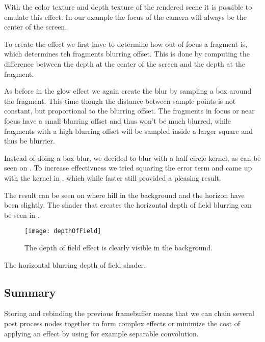 With the color texture and depth texture of the rendered scene it is
possible to emulate this effect. In our example the focus of the
camera will always be the center of the screen.

To create the effect we first have to determine how out of focus a
fragment is, which determines teh fragments blurring offset. This is
done by computing the difference between the depth at the center of
the screen and the depth at the fragment.

As before in the glow effect we again create the blur by sampling a
box around the fragment. This time though the distance between sample
points is not constant, but proportional to the blurring offset. The
fragments in focus or near focus have a small blurring offset and thus
won't be much blurred, while fragments with a high blurring offset
will be sampled inside a larger square and thus be blurrier.

Instead of doing a box blur, we decided to blur with a half circle
kernel, as can be seen on . To increase
effectivness we tried squaring the error term and came up with the
kernel in , which while faster still
provided a pleasing result.

The result can be seen on  where hill in the
background and the horizon have been slightly. The shader that creates
the horizontal depth of field blurring can be seen in .

\begin{figure}
  \label{fig:depthOfField}
  \centering
  \texttt{[image: depthOfField]}
  \caption{The depth of field effect is clearly visible in the background.}
\end{figure}

\begin{listing}
\label{lst:dofShader}
\centering

\caption{The horizontal blurring depth of field shader.}
\end{listing}



\subsection{Summary}

Storing and rebinding the previous framebuffer means that we can chain
several post process nodes together to form complex effects or
minimize the cost of applying an effect by using for example separable
convolution.






